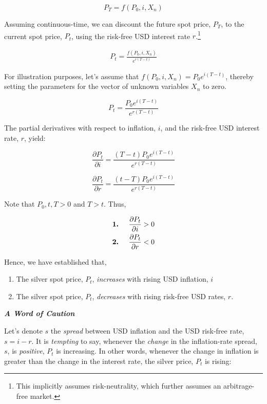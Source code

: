 \documentclass[
  12pt,
]{article}
\providecommand{\tightlist}{%
  \setlength{\itemsep}{0pt}\setlength{\parskip}{0pt}}
\begin{document}
\[P_{T} = f(P_{0}, i, X_n)\]

Assuming continuous-time, we can discount the future spot price,
\(P_T\), to the current spot price, \(P_t\), using the risk-free USD
interest rate \(r\).\footnote{This implicitly assumes risk-neutrality,
  which further assumes an arbitrage-free market.}

\begin{align}
P_t = \frac{f(P_{0}, i, X_n)}{e^{r(T-t)}}
\end{align}

For illustration purposes, let's assume that
\(f(P_0, i, X_n) = P_0 e^{i(T-t)}\), thereby setting the parameters for
the vector of unknown variables \(X_n\) to zero.

\[P_t = \frac{P_0 e^{i(T-t)}}{e^{r(T-t)}}\]

The partial derivatives with respect to inflation, \(i\), and the
risk-free USD interest rate, \(r\), yield:

\[\frac{\partial P_{t}}{\partial i} = \frac{(T-t)P_0 e^{i(T-t)}}{e^{r(T-t)}}\]

\[\frac{\partial P_{t}}{\partial r} = \frac{(t-T)P_0 e^{i(T-t)}}{e^{r(T-t)}}\]

Note that \(P_0, t, T > 0\) and \(T>t\). Thus,

\begin{align}
\textbf{1.} \hspace{5mm} \frac{\partial P_{t}}{\partial i} &> 0 \notag\\
\textbf{2.} \hspace{5mm} \frac{\partial P_{t}}{\partial r} &< 0 \notag
\end{align}

Hence, we have established that,

\begin{enumerate}
\def\labelenumi{\arabic{enumi}.}
\tightlist
\item
  The silver spot price, \(P_t\), \emph{increases} with rising USD
  inflation, \(i\)
\item
  The silver spot price, \(P_t\), \emph{decreases} with rising risk-free
  USD rates, \(r\).
\end{enumerate}

\vspace{5 mm}

\textbf{\emph{A Word of Caution}}

Let's denote \(s\) the \emph{spread} between USD inflation and the USD
risk-free rate, \(s = i - r\). It is \emph{tempting} to say, whenever
the \emph{change} in the inflation-rate spread, \(s\), is
\emph{positive}, \(P_t\) is increasing. In other words, whenever the
change in inflation is greater than the change in the interest rate, the
silver price, \(P_t\) is rising:
\end{document}
